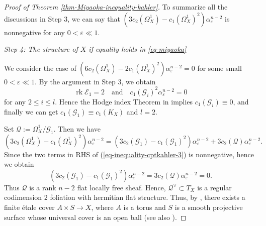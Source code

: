 \documentclass[12pt]{amsart}
\theoremstyle{definition}
\theoremstyle{remark}
\numberwithin{equation}{section}
\newcommand{\rk}[0]{\operatorname{rk}}
\begin{document}
\begin{proof}[Proof of Theorem \ref{thm-Miyaoka-inequality-kahler}]
To summarize all the discussions in Step 3, we can say that $\left(3c_2(\Omega_{X}^{1}) - c_1(\Omega_{X}^{1})^2 \right)\alpha_{ \varepsilon } ^{n-2}$ is nonnegative for any $0 < \varepsilon \ll 1$.


\vspace{0.5\baselineskip}
\emph{Step 4: The structure of $X$ if equality holds in \eqref{eq-miyaoka}}
\vspace{0.5\baselineskip}

We consider the case of 
$\left(6c_2(\Omega_{X}^{1}) - 2c_1(\Omega_{X}^{1})^2 \right)\alpha_{ \varepsilon } ^{n-2} =0 $  for some small $0 < \varepsilon \ll 1$. 
By the argument in Step 3, we obtain 
$$\rk \mathcal{E}_1 =2 \quad \text{and} \quad c_1(\mathcal{G}_i)^2 \alpha_{ \varepsilon } ^{n-2} = 0$$
for any $2 \le i \le l$. Hence the Hodge index Theorem in \cite[Lemma 6.1]{IM22} implies $c_1(\mathcal{G}_i) \equiv0$, and finally we can get $c_1(\mathcal{G}_1) \equiv c_1(K_X)$ and $l=2$. 

Set $\mathcal{Q} := \Omega_{X}^{1}/\mathcal{G}_1$. Then we have 
\begin{equation}
\label{eq-inequality-cptkahler-3}
\left(3c_2(\Omega_{X}^{1}) - c_1(\Omega_{X}^{1})^2 \right)\alpha_{ \varepsilon } ^{n-2}
= \left(3c_2(\mathcal{G}_1) - c_1(\mathcal{G}_1)^2 \right)\alpha_{ \varepsilon } ^{n-2}
+ 3c_2(\mathcal{Q})\alpha_{ \varepsilon } ^{n-2}.
\end{equation}
Since the two terms in RHS of (\ref{eq-inequality-cptkahler-3}) is nonnegative, hence we obtain
$$
 \left(3c_2(\mathcal{G}_1) - c_1(\mathcal{G}_1)^2 \right)\alpha_{ \varepsilon } ^{n-2}
= 3c_2(\mathcal{Q})\alpha_{ \varepsilon } ^{n-2} =0.
$$
Thus $\mathcal{Q}$ is a rank $n-2$ flat locally free sheaf.
Hence, $\mathcal{Q}^{\vee} \subset T_X$ is a regular codimension 2 foliation with hermitian flat structure. 
Thus, by \cite{PT13}, there exists a finite \'etale cover $A \times S \rightarrow X$, where $A$ is a torus and $S$ is a smooth projective surface whose universal cover is an open ball (see also \cite[Theorem 4.12]{IMM24}).


\end{proof}
\end{document}
